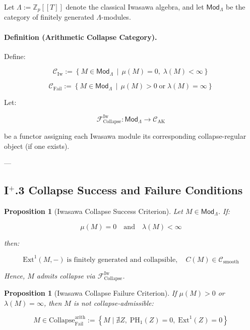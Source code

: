 \documentclass[11pt]{article}
\newtheorem{proposition}[theorem]{Proposition}
\begin{document}
Let $\Lambda := \mathbb{Z}_p[[T]]$ denote the classical Iwasawa algebra, and let $\mathsf{Mod}_\Lambda$ be the category of finitely generated $\Lambda$-modules.

\paragraph{Definition (Arithmetic Collapse Category).}

Define:

\[
\mathcal{C}_{\mathrm{Iw}} := \left\{ M \in \mathsf{Mod}_\Lambda \,\middle|\, \mu(M) = 0,\; \lambda(M) < \infty \right\}
\]

\[
\mathcal{C}_{\mathrm{Fail}} := \left\{ M \in \mathsf{Mod}_\Lambda \,\middle|\, \mu(M) > 0 \;\text{or}\; \lambda(M) = \infty \right\}
\]

Let:

\[
\mathcal{F}_{\mathrm{Collapse}}^{\mathrm{Iw}} : \mathsf{Mod}_\Lambda \to \mathcal{C}_{\mathrm{AK}}
\]

be a functor assigning each Iwasawa module its corresponding collapse-regular object (if one exists).

---

\subsection*{I$^{+}$.3 Collapse Success and Failure Conditions}

\begin{proposition}[Iwasawa Collapse Success Criterion]
Let $M \in \mathsf{Mod}_\Lambda$. If:

\[
\mu(M) = 0 \quad \text{and} \quad \lambda(M) < \infty
\]

then:

\[
\mathrm{Ext}^1(M, -) \;\text{is finitely generated and collapsible},\quad C(M) \in \mathcal{C}_{\mathrm{smooth}}
\]

Hence, $M$ admits collapse via $\mathcal{F}_{\mathrm{Collapse}}^{\mathrm{Iw}}$.
\end{proposition}

\begin{proposition}[Iwasawa Collapse Failure Criterion]
If $\mu(M) > 0$ or $\lambda(M) = \infty$, then $M$ is not collapse-admissible:

\[
M \in \mathrm{Collapse}_{\mathrm{Fail}}^{\mathrm{arith}} := \left\{ M \mid \nexists Z,\; \mathrm{PH}_1(Z) = 0,\; \mathrm{Ext}^1(Z) = 0 \right\}
\]
\end{proposition}
\end{document}
